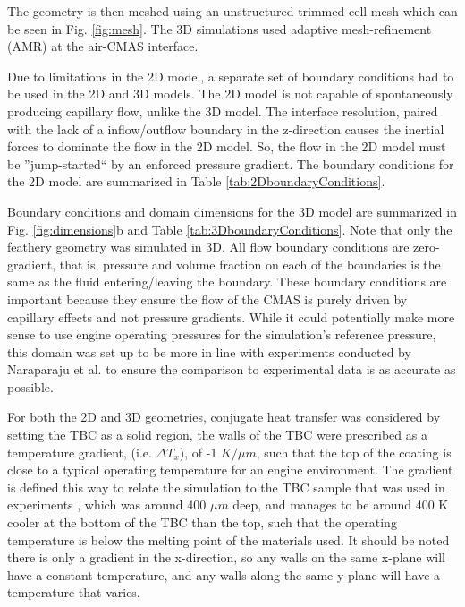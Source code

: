 \documentclass[%
 aip,
 amsmath,amssymb,
 reprint,%
floatfix]{revtex4-1}
\begin{document}
The geometry is then meshed using an unstructured trimmed-cell mesh which can be seen in Fig. \ref{fig:mesh}. The 3D simulations used adaptive mesh-refinement (AMR) at the air-CMAS interface. 

Due to limitations in the 2D model, a separate set of boundary conditions had to be used in the 2D and 3D models. The 2D model is not capable of spontaneously producing capillary flow, unlike the 3D model. The interface resolution, paired with the lack of a inflow/outflow boundary in the z-direction causes the inertial forces to dominate the flow in the 2D model. So, the flow in the 2D model must be ''jump-started`` by an enforced pressure gradient. The boundary conditions for the 2D model are summarized in Table \ref{tab:2DboundaryConditions}. 

Boundary conditions and domain dimensions for the 3D model are summarized in Fig. \ref{fig:dimensions}b and Table \ref{tab:3DboundaryConditions}. Note that only the feathery geometry was simulated in 3D. All flow boundary conditions are zero-gradient, that is, pressure and volume fraction on each of the boundaries is the same as the fluid entering/leaving the boundary. These boundary conditions are important because they ensure the flow of the CMAS is purely driven by capillary effects and not pressure gradients. While it could potentially make more sense to use engine operating pressures for the simulation's reference pressure, this domain was set up to be more in line with experiments conducted by Naraparaju et al. \cite{Naraparaju2014, Naraparaju2017, Naraparaju2019} to ensure the comparison to experimental data is as accurate as possible.

For both the 2D and 3D geometries, conjugate heat transfer was considered by setting the TBC as a solid region, the walls of the TBC were prescribed as a temperature gradient, (i.e. $\Delta T_{x}$), of -1 $K/\mu m$, such that the top of the coating is close to a typical operating temperature for an engine environment. The gradient is defined this way to relate the simulation to the TBC sample that was used in experiments \cite{Naraparaju2019}, which was around 400 $\mu m$ deep, and manages to be around 400 K cooler at the bottom of the TBC than the top, such that the operating temperature is below the melting point of the materials used. It should be noted there is only a gradient in the x-direction, so any walls on the same x-plane will have a constant temperature, and any walls along the same y-plane will have a temperature that varies. 
\end{document}
